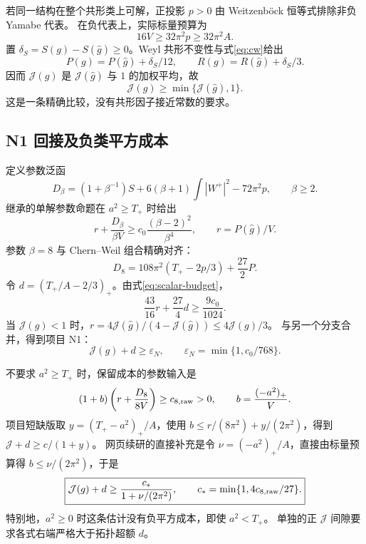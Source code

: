 \documentclass[UTF8,11pt,a4paper,fontset=none]{ctexart}
\numberwithin{equation}{section}
\theoremstyle{definition}
\theoremstyle{remark}\newtheorem{remark}[theorem]{说明}
\newcommand{\Jcal}{\mathcal J}
\begin{document}
若同一结构在整个共形类上可解，正投影 $p>0$ 由 Weitzenböck 恒等式排除非负 Yamabe 代表。
在负代表上，实际标量预算为
\begin{equation}\label{eq:scalar-budget}
16V\ge32\pi^2p\ge32\pi^2A.
\end{equation}
置 $\delta_S=S(g)-S(\widehat g)\ge0$。Weyl 共形不变性与式\eqref{eq:cw}给出
\begin{equation}\label{eq:conformal}
P(g)=P(\widehat g)+\delta_S/12,
\qquad R(g)=R(\widehat g)+\delta_S/3.
\end{equation}
因而 $\Jcal(g)$ 是 $\Jcal(\widehat g)$ 与 $1$ 的加权平均，故
\begin{equation}\label{eq:Jcompare}
\Jcal(g)\ge\min\{\Jcal(\widehat g),1\}.
\end{equation}
这是一条精确比较，没有共形因子接近常数的要求。

\subsection{N1 回接及负类平方成本}
定义参数泛函
\begin{equation}\label{eq:Dbeta}
D_\beta=(1+\beta^{-1})S+6(\beta+1)\int|W^+|^2-72\pi^2p,
\qquad \beta\ge2.
\end{equation}
继承的单解参数命题\cite{N1}在 $a^2\ge T_+$ 时给出
\begin{equation}\label{eq:param-input}
r+\frac{D_\beta}{\beta V}\ge c_0\frac{(\beta-2)^2}{\beta^4},
\qquad r=P(\widehat g)/V.
\end{equation}
参数 $\beta=8$ 与 Chern--Weil 组合精确对齐：
\begin{equation}\label{eq:D8}
D_8=108\pi^2(T_+-2p/3)+\frac{27}{2}P.
\end{equation}
令 $d=(T_+/A-2/3)_+$。由式\eqref{eq:scalar-budget}，
\[
\frac{43}{16}r+\frac{27}{4}d\ge\frac{9c_0}{1024}.
\]
当 $\Jcal(g)<1$ 时，$r=4\Jcal(\widehat g)/(4-\Jcal(\widehat g))\le4\Jcal(g)/3$。
与另一个分支合并，得到项目 N1：
\begin{equation}\label{eq:N1}
\boxed{\Jcal(g)+d\ge\varepsilon_N,\qquad
\varepsilon_N=\min\{1,c_0/768\}.}
\end{equation}

不要求 $a^2\ge T_+$ 时，保留成本的参数输入是
\begin{equation}\label{eq:cost-input}
(1+b)\left(r+\frac{D_8}{8V}\right)\ge c_{8,\rm raw}>0,
\qquad b=\frac{(-a^2)_+}{V}.
\end{equation}
项目短缺版取 $y=(T_+-a^2)_+/A$，使用
$b\le r/(8\pi^2)+y/(2\pi^2)$，得到 $\Jcal+d\ge c/(1+y)$。
网页续研的直接补充是令 $\nu=(-a^2)_+/A$，直接由标量预算得 $b\le\nu/(2\pi^2)$，于是
\begin{equation}\label{eq:negative-square}
\boxed{\Jcal(g)+d\ge
\frac{c_*}{1+\nu/(2\pi^2)},\qquad
c_* =\min\{1,4c_{8,\rm raw}/27\}.}
\end{equation}
特别地，$a^2\ge0$ 时这条估计没有负平方成本，即使 $a^2<T_+$。
单独的正 $\Jcal$ 间隙要求各式右端严格大于拓扑超额 $d$。
\end{document}
